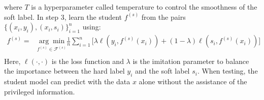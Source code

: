 where $T$ is a hyperparameter called temperature to control the smoothness of the soft label. In step 3, learn the student ${f}^{(s)}$ from the pairs $\{\left(x_i,y_i\right),\left(x_i,s_i\right)\}_{i=1}^n$ using:
\begin{equation}\label{eq:distill}
\begin{aligned}
f^{(s)}=&\underset{f^{(s)} \in \mathcal{F}^{(s)}}{\arg \min}\frac{1}{n}\sum_{i=1}^{n}\bigg[\lambda\ell\left(y_i,f^{(s)}(x_i)\right)+(1-\lambda)\ell\left(s_i,f^{(s)}(x_i)\right)\bigg]\\
\end{aligned}
\end{equation}
Here, $\ell(\cdot,\cdot)$ is the loss function and $\lambda$ is the imitation parameter to balance the importance between the hard label $y_i$ and the soft label $s_i$. When testing, the student model can predict with the data $x$ alone without the assistance of the privileged information.

